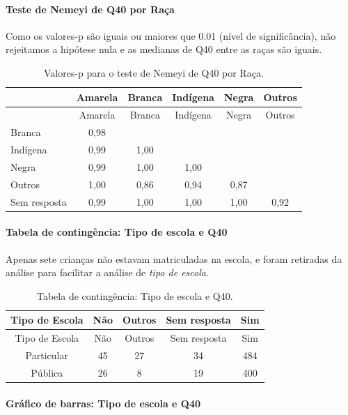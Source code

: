 \documentclass[]{article}
\let\oldparagraph\paragraph
\renewcommand{\paragraph}[1]{\oldparagraph{#1}\mbox{}}
\begin{document}
\hypertarget{teste-de-nemeyi-de-q40-por-rauxe7a}{%
\paragraph{Teste de Nemeyi de Q40 por Raça}\label{teste-de-nemeyi-de-q40-por-rauxe7a}}

Como os valores-p são iguais ou maiores que 0.01 (nível de significância), não rejeitamos a hipótese nula e as medianas de Q40 entre as raças são iguais.

\begin{longtable}[]{@{}lccccc@{}}
\caption{\label{tab:unnamed-chunk-1586}Valores-p para o teste de Nemeyi de Q40 por Raça.}\tabularnewline
\toprule
& Amarela & Branca & Indígena & Negra & Outros\tabularnewline
\midrule
\endfirsthead
\toprule
& Amarela & Branca & Indígena & Negra & Outros\tabularnewline
\midrule
\endhead
Branca & 0,98 & & & &\tabularnewline
Indígena & 0,99 & 1,00 & & &\tabularnewline
Negra & 0,99 & 1,00 & 1,00 & &\tabularnewline
Outros & 1,00 & 0,86 & 0,94 & 0,87 &\tabularnewline
Sem resposta & 0,99 & 1,00 & 1,00 & 1,00 & 0,92\tabularnewline
\bottomrule
\end{longtable}

\cleardoublepage

\hypertarget{tabela-de-continguxeancia-tipo-de-escola-e-q40}{%
\paragraph{Tabela de contingência: Tipo de escola e Q40}\label{tabela-de-continguxeancia-tipo-de-escola-e-q40}}

Apenas sete crianças não estavam matriculadas na escola, e foram retiradas da análise para facilitar a análise de \emph{tipo de escola}.

\begin{longtable}[]{@{}ccccc@{}}
\caption{\label{tab:unnamed-chunk-1587}Tabela de contingência: Tipo de escola e Q40.}\tabularnewline
\toprule
Tipo de Escola & Não & Outros & Sem resposta & Sim\tabularnewline
\midrule
\endfirsthead
\toprule
Tipo de Escola & Não & Outros & Sem resposta & Sim\tabularnewline
\midrule
\endhead
Particular & 45 & 27 & 34 & 484\tabularnewline
Pública & 26 & 8 & 19 & 400\tabularnewline
\bottomrule
\end{longtable}

\hypertarget{gruxe1fico-de-barras-tipo-de-escola-e-q40}{%
\paragraph{Gráfico de barras: Tipo de escola e Q40}\label{gruxe1fico-de-barras-tipo-de-escola-e-q40}}
\end{document}
